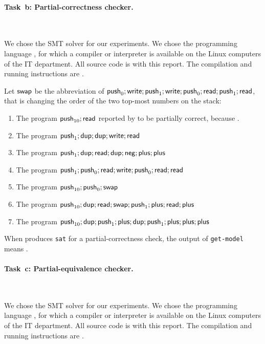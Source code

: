 \paragraph{Task~b: Partial-correctness checker.}~
%

We chose the SMT solver \SolverSMT for our experiments.
%
We chose the programming language \todo{\filler}, for which a compiler
or interpreter is available on the Linux computers of the IT
department.  All source code is  with this report.  The
compilation and running instructions are \todo{\filler}.

Let $\mathsf{swap}$ be the abbreviation of
$\mathsf{push}_{0}; \mathsf{write}; \mathsf{push}_{1}; \mathsf{write}; \mathsf{push}_{0}; \mathsf{read}; \mathsf{push}_{1};
\mathsf{read}$, that is changing the order of the two top-most numbers on the
stack:
\begin{enumerate}
\item The program $\mathsf{push}_{10}; \mathsf{read}$  reported by
  \SolverSMT to be partially correct, because \todo{\filler}.
\item The program $\mathsf{push}_{1}; \mathsf{dup}; \mathsf{dup}; \mathsf{write}; \mathsf{read}$ \todo{\filler}
\item The program $\mathsf{push}_{1}; \mathsf{dup}; \mathsf{read}; \mathsf{dup}; \mathsf{neg}; \mathsf{plus}; \mathsf{plus}$
  \todo{\filler}
\item The program
  $\mathsf{push}_{1}; \mathsf{push}_{0}; \mathsf{read}; \mathsf{write}; \mathsf{push}_{0}; \mathsf{read}; \mathsf{read}$
  \todo{\filler}
\item The program $\mathsf{push}_{10}; \mathsf{push}_{0}; \mathsf{swap}$ \todo{\filler}
\item The program
  $\mathsf{push}_{10}; \mathsf{dup}; \mathsf{read}; \mathsf{swap}; \mathsf{push}_{1}; \mathsf{plus}; \mathsf{read}; \mathsf{plus}$
  \todo{\filler}
\item The program
  $\mathsf{push}_{10}; \mathsf{dup}; \mathsf{push}_{1}; \mathsf{plus}; \mathsf{dup}; \mathsf{push}_{1}; \mathsf{plus}; \mathsf{plus};
  \mathsf{plus}$ \todo{\filler}
\end{enumerate}
When \SolverSMT produces \texttt{sat} for a partial-correctness check,
the output of \texttt{get-model} means \todo{\filler}.

\paragraph{Task~c: Partial-equivalence checker.}~
%

We chose the SMT solver \SolverSMT for our experiments.
%
We chose the programming language \todo{\filler}, for which a compiler
or interpreter is available on the Linux computers of the IT
department.  All source code is  with this report.  The
compilation and running instructions are \todo{\filler}.

